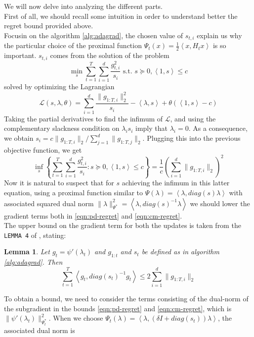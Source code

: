 \documentclass[notitlepage]{article}
\newcommand*\circled[1]{\tikz[baseline=(char.base)]{\node[shape=circle,draw,inner sep=2pt] (char) {#1};}}
\newtheorem{lemma}{Lemma}[section]
\begin{document}
We will now delve into analyzing the different \circled{$\cdot$} parts.\\
First of all, we should recall some intuition in order to understand better the regret bound provided above.\\
Focusin on the algorithm \ref{alg:adagrad}, the chosen value of $s_{t,i}$ explain us why the particular choice of the proximal function $\Psi_t(x) = \frac{1}{2} \left\langle x,H_t x \right\rangle$ is so important. $s_{t,i}$ comes from the solution of the problem
\[ \min_s \sum_{t=1}^T \sum_{i=1}^d \frac{g_{t,i}^2}{s_i} \text{ s.t. } s \succeq 0, \left\langle 1,s \right\rangle \le c \] 
solved by optimizing the Lagrangian
\[ 
  \mathcal{L}(s,\lambda,\theta) = \sum_{i=1}^d \frac{\| g_{1:T,i} \|_2^2}{s_i} - \left\langle \lambda,s \right\rangle + \theta (\left\langle 1,s \right\rangle - c ) 
\]
Taking the partial derivatives to find the infimum of $\mathcal{L}$, and using the complementary slackness condition on $\lambda_i s_i$ imply that $\lambda_i = 0$. As a consequence, we obtain $s_i = c \| g_{1:T,i} \|_2 / \sum_{j=1}^d \| g_{1:T,j} \|_2$.
Plugging this into the previous objective function, we get
\[ \inf_s \left\lbrace \sum_{t=1}^T \sum_{i=1}^d \frac{g_{t,i}^2}{s_i} : s \succeq 0, \left\langle 1,s \right\rangle \le c \right\rbrace = \frac{1}{c} \left(\sum_{i=1}^d \| g_{1:T,i} \|_2 \right)^2  \]
Now it is natural to suspect that for $s$ achieving the infimum in this latter equation, using a proximal function similar to $\Psi(\lambda) = \left\langle \lambda,diag(s) \lambda \right\rangle$ with associated squared dual norm $\|\lambda\|_{\Psi^*}^2 = \left\langle \lambda,diag(s)^{-1}\lambda \right\rangle$ we should 
lower the gradient terms both in \eqref{eqn:pd-regret} and \eqref{eqn:cm-regret}.\\
The upper bound on the gradient term for both the updates is taken from the \texttt{LEMMA 4} of \cite{JMLR:v12:duchi11a}, stating:
\begin{lemma}
  Let $g_t = \psi'(\lambda_t)$ and $g_{1:t}$ and $s_t$ be defined as in algorithm \ref{alg:adagrad}. Then 
  \[ \sum_{t=1}^T \left\langle g_t,diag(s_t)^{-1}g_t \right\rangle \le 2 \sum_{i=1}^d \|g_{1:T,i}\|_2 \]
\end{lemma}
To obtain a bound, we need to consider the terms consisting of the dual-norm of the subgradient in the bounds \eqref{eqn:pd-regret} and \eqref{eqn:cm-regret}, which is $\|\psi'(\lambda_t)\|_{\Psi_t^*}^2$. When we choose $\Psi_t(\lambda) = \left\langle \lambda,(\delta I + diag(s_t)) \lambda \right\rangle$, the associated dual norm is
\end{document}
